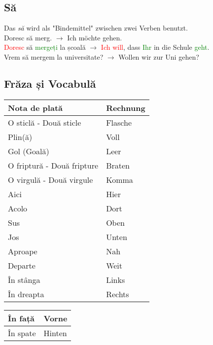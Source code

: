 \documentclass[11pt, oneside]{article}
\begin{document}
\subsection{Să}
Das \emph{să} wird als "Bindemittel" zwischen zwei Verben benutzt.\\
\newline
Doresc să merg. $\rightarrow$ Ich möchte gehen.\\
\textcolor{Red}{Doresc} să \textcolor{Green}{mergeți} la școală $\rightarrow$ \textcolor{Red}{Ich will}, dass \textcolor{Green}{Ihr} in die Schule \textcolor{Green}{geht}.\\
Vrem să mergem la universitate? $\rightarrow$ Wollen wir zur Uni gehen?
%
\subsection{Frăza și Vocabulă}
\begin{center}
  \begin{tabular}{ | p{6cm}| p{6cm} | } 
    \hline
    Nota de plată & Rechnung\\
    \hline
    O sticlă - Două sticle & Flasche\\
    \hline
    Plin(ă) & Voll\\
    \hline
    Gol (Goală) & Leer\\
    \hline
    O friptură - Două fripture & Braten\\
    \hline
    O virgulă - Două virgule & Komma\\
    \hline
    Aici & Hier\\
    \hline
    Acolo & Dort\\
    \hline
    Sus & Oben\\
    \hline
    Jos & Unten\\
    \hline
    Aproape & Nah\\
    \hline
    Departe & Weit\\
    \hline
    În stânga & Links\\
    \hline
    În dreapta & Rechts\\
    \hline
  \end{tabular}
\end{center}
\begin{center}
  \begin{tabular}{ | p{6cm}| p{6cm} | } 
    \hline
    În față & Vorne\\
    \hline
    În spate & Hinten\\
    \hline
  \end{tabular}
\end{center}
\end{document}
